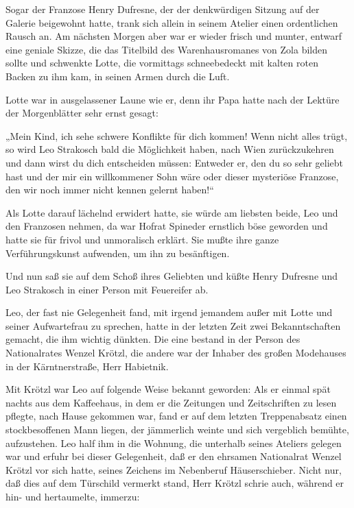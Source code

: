 Sogar der Franzose Henry Dufresne, der der denkwürdigen Sitzung auf
der Galerie beigewohnt hatte, trank sich allein in seinem Atelier
einen ordentlichen Rausch an. Am nächsten Morgen aber war er wieder
frisch und munter, entwarf eine geniale Skizze, die das Titelbild
des Warenhausromanes von Zola bilden sollte und schwenkte Lotte,
die vormittags schneebedeckt mit kalten roten Backen zu ihm kam, in
seinen Armen durch die Luft.

Lotte war in ausgelassener Laune wie er, denn ihr
Papa hatte nach der Lektüre der Morgenblätter sehr ernst gesagt:

„Mein Kind, ich sehe schwere Konflikte für dich kommen! Wenn nicht
alles trügt, so wird Leo Strakosch bald die Möglichkeit haben, nach
Wien zurückzukehren und dann wirst du dich entscheiden müssen:
Entweder er, den du so sehr geliebt hast und der mir ein
willkommener Sohn wäre oder dieser mysteriöse Franzose, den wir
noch immer nicht kennen gelernt haben!“

Als Lotte darauf lächelnd erwidert hatte, sie würde am liebsten
beide, Leo und den Franzosen nehmen, da war Hofrat Spineder
ernstlich böse geworden und hatte sie für frivol und unmoralisch
erklärt. Sie mußte ihre ganze Verführungskunst aufwenden, um ihn zu
besänftigen.

Und nun saß sie auf dem Schoß ihres Geliebten und küßte Henry
Dufresne und Leo Strakosch in einer Person mit Feuereifer ab.

\tb{* * *}
Leo, der fast nie Gelegenheit fand, mit irgend jemandem außer mit
Lotte und seiner Aufwartefrau zu sprechen, hatte in der letzten
Zeit zwei Bekanntschaften gemacht, die ihm wichtig dünkten. Die
eine bestand in der Person des Nationalrates Wenzel Krötzl, die
andere war der Inhaber des großen Modehauses in der Kärntnerstraße,
Herr Habietnik.

Mit Krötzl war Leo auf folgende Weise bekannt geworden: Als er
einmal spät nachts aus dem Kaffeehaus,  in dem er
die Zeitungen und Zeitschriften zu lesen pflegte, nach Hause
gekommen war, fand er auf dem letzten Treppenabsatz einen
stockbesoffenen Mann liegen, der jämmerlich weinte und sich
vergeblich bemühte, aufzustehen. Leo half ihm in die Wohnung, die
unterhalb seines Ateliers gelegen war und erfuhr bei dieser
Gelegenheit, daß er den ehrsamen Nationalrat Wenzel Krötzl vor sich
hatte, seines Zeichens im Nebenberuf Häuserschieber. Nicht nur, daß
dies auf dem Türschild vermerkt stand, Herr Krötzl schrie auch,
während er hin- und hertaumelte, immerzu:

